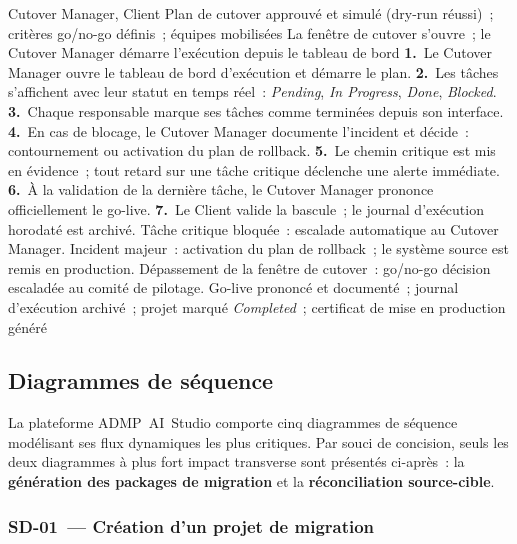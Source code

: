   {Cutover Manager, Client}
  {Plan de cutover approuvé et simulé (dry-run réussi)~; critères go/no-go définis~; équipes mobilisées}
  {La fenêtre de cutover s'ouvre~; le Cutover Manager démarre l'exécution depuis le tableau de bord}
  {\textbf{1.}~Le Cutover Manager ouvre le tableau de bord d'exécution et démarre le plan.\newline
   \textbf{2.}~Les tâches s'affichent avec leur statut en temps réel~: \textit{Pending}, \textit{In Progress}, \textit{Done}, \textit{Blocked}.\newline
   \textbf{3.}~Chaque responsable marque ses tâches comme terminées depuis son interface.\newline
   \textbf{4.}~En cas de blocage, le Cutover Manager documente l'incident et décide~: contournement ou activation du plan de rollback.\newline
   \textbf{5.}~Le chemin critique est mis en évidence~; tout retard sur une tâche critique déclenche une alerte immédiate.\newline
   \textbf{6.}~À la validation de la dernière tâche, le Cutover Manager prononce officiellement le go-live.\newline
   \textbf{7.}~Le Client valide la bascule~; le journal d'exécution horodaté est archivé.}
  {Tâche critique bloquée~: escalade automatique au Cutover Manager. Incident majeur~: activation du plan de rollback~; le système source est remis en production. Dépassement de la fenêtre de cutover~: go/no-go décision escaladée au comité de pilotage.}
  {Go-live prononcé et documenté~; journal d'exécution archivé~; projet marqué \textit{Completed}~; certificat de mise en production généré}

\subsection{Diagrammes de séquence}
\label{subsec:sequences}

La plateforme ADMP~AI~Studio comporte cinq diagrammes de séquence modélisant ses flux dynamiques les plus critiques. Par souci de concision, seuls les deux diagrammes à plus fort impact transverse sont présentés ci-après~: la \textbf{génération des packages de migration} et la \textbf{réconciliation source-cible}.

\iffalse %
\subsubsection*{SD-01~--- Création d'un projet de migration}

